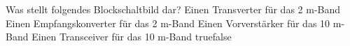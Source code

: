     {Was stellt folgendes Blockschaltbild dar?}
    {Einen Transverter für das 2 m-Band}
    {Einen Empfangskonverter für das 2 m-Band}
    {Einen Vorverstärker für das 10 m-Band}
    {Einen Transceiver für das 10 m-Band}
    {true}{false}